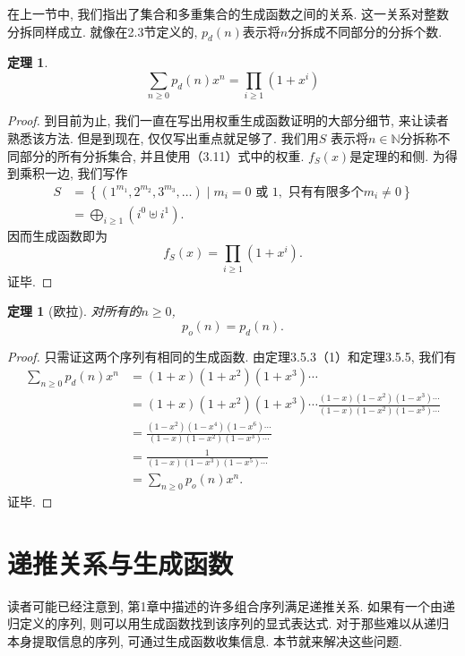 \documentclass[a4paper,12pt]{ctexbook}
\newtheorem{theorem}[lemma]{\hspace{2em}定理}%
\begin{document}
在上一节中, 我们指出了集合和多重集合的生成函数之间的关系. 这一关系对整数分拆同样成立. 就像在2.3节定义的, $p_{d}(n)$表示将$n$分拆成不同部分的分拆个数.
\begin{theorem}
	$$
	\sum_{n \geq 0} p_{d}(n) x^{n}=\prod_{i \geq 1}\left(1+x^{i}\right)
	$$
\end{theorem}
\begin{proof}
	到目前为止, 我们一直在写出用权重生成函数证明的大部分细节, 来让读者熟悉该方法. 但是到现在, 仅仅写出重点就足够了. 我们用$S$ 表示将$n \in \mathbb{N}$分拆称不同部分的所有分拆集合, 并且使用（3.11）式中的权重. $f_{S}(x)$是定理的和侧. 为得到乘积一边, 我们写作$$
	\begin{aligned}
	S &=\left\{\left(1^{m_{1}}, 2^{m_{2}}, 3^{m_{3}}, \ldots\right) \mid m_{i}=0 \text { 或 } 1 , \text { 只有有限多个} m_{i} \neq 0\right\} \\
	&=\bigoplus_{i \geq 1}\left(i^{0} \uplus i^{1}\right).
	\end{aligned}
	$$因而生成函数即为$$
	f_{S}(x)=\prod_{i \geq 1}\left(1+x^{i}\right).
	$$证毕.
\end{proof}
\begin{theorem}[欧拉]
		对所有的$n \geq 0$, $$
	p_{o}(n)=p_{d}(n) .
	$$
\end{theorem}
\begin{proof}
	只需证这两个序列有相同的生成函数. 由定理3.5.3（1）和定理3.5.5, 我们有$$
	\begin{aligned}
	\sum_{n \geq 0} p_{d}(n) x^{n} &=(1+x)\left(1+x^{2}\right)\left(1+x^{3}\right) \cdots \\
	&=(1+x)\left(1+x^{2}\right)\left(1+x^{3}\right) \cdots \frac{(1-x)\left(1-x^{2}\right)\left(1-x^{3}\right) \cdots}{(1-x)\left(1-x^{2}\right)\left(1-x^{3}\right) \cdots} \\
	&=\frac{\left(1-x^{2}\right)\left(1-x^{4}\right)\left(1-x^{6}\right) \cdots}{(1-x)\left(1-x^{2}\right)\left(1-x^{3}\right) \cdots} \\
	&=\frac{1}{(1-x)\left(1-x^{3}\right)\left(1-x^{5}\right) \cdots} \\
	&=\sum_{n \geq 0} p_{o}(n) x^{n}.
	\end{aligned}
	$$证毕.
\end{proof}

\section{递推关系与生成函数}
读者可能已经注意到, 第1章中描述的许多组合序列满足递推关系. 如果有一个由递归定义的序列, 则可以用生成函数找到该序列的显式表达式. 对于那些难以从递归本身提取信息的序列, 可通过生成函数收集信息. 本节就来解决这些问题.
\end{document}
